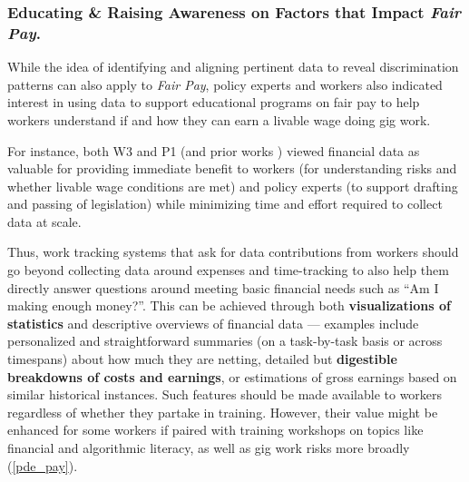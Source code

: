 \subsubsection{\textbf{{Educating \& Raising Awareness on Factors that Impact \textit{Fair Pay}}.}}
{While the idea of identifying and aligning pertinent data to reveal discrimination patterns can also apply to \textit{Fair Pay}, policy experts and workers also indicated interest in using data to support educational programs on fair pay to help workers understand if and how they can earn a livable wage doing gig work. 

For instance, both W3 and P1 (and prior works \cite{xAXX, finlit}) viewed financial data as valuable for providing immediate benefit to workers (for understanding risks and whether livable wage conditions are met) and policy experts (to support drafting and passing of legislation) while minimizing time and effort required to collect data at scale.

Thus, work tracking systems that ask for data contributions from workers should go beyond collecting data around expenses and time-tracking to also help them directly answer questions around meeting basic financial needs such as ``Am I making enough money?''. This can be achieved through both \textbf{visualizations of statistics} and descriptive overviews of financial data --- examples include personalized and straightforward summaries (on a task-by-task basis or across timespans) about how much they are netting, detailed but \textbf{digestible breakdowns of costs and earnings}, or estimations of gross earnings based on similar historical instances.
Such features should be made available to workers regardless of whether they partake in training. However, their value might be enhanced for some workers if paired with training workshops on topics like financial and algorithmic literacy, as well as gig work risks more broadly (\ref{pde_pay}).
%

}
